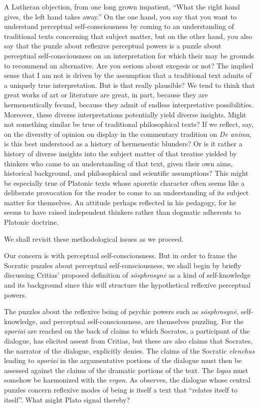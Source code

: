 A Lutheran objection, from one long grown impatient, ``What the right hand gives, the left hand takes away.'' On the one hand, you say that you want to understand perceptual self-consciousness by coming to an understanding of traditional texts concerning that subject matter, but on the other hand, you also say that the puzzle about reflexive perceptual powers is a puzzle about perceptual self-consciousness on an interpretation for which their may be grounds to recommend an alternative. Are you serious about exegesis or not? The implied sense that I am not is driven by the assumption that a traditional text admits of a uniquely true interpretation. But is that really plausible? We tend to think that great works of art or literature are great, in part, because they are hermeneutically fecund, because they admit of endless interpretative possibilities. Moreover, these diverse interpretations potentially yield diverse insights. Might not something similar be true of traditional philosophical texts? If we reflect, say, on the diversity of opinion on display in the commentary tradition on \emph{De anima}, is this best understood as a history of hermeneutic blunders? Or is it rather a history of diverse insights into the subject matter of that treatise yielded by thinkers who came to an understanding of that text, given their own aims, historical background, and philosophical and scientific assumptions? This might be especially true of Platonic texts whose aporetic character often seems like a deliberate provocation for the reader to come to an understanding of its subject matter for themselves. An attitude perhaps reflected in his pedagogy, for he seems to have raised independent thinkers rather than dogmatic adherents to Platonic doctrine.

We shall revisit these methodological issues as we proceed.

Our concern is with perceptual self-consciousness. But in order to frame the Socratic puzzles about perceptual self-consciousness, we shall begin by briefly discussing Critias' proposed definition of \emph{sōsphrosynē} as a kind of self-knowledge and its background since this will structure the hypothetical reflexive perceptual powers. 

The puzzles about the reflexive being of psychic powers such as \emph{sōsphrosynē}, self-knowledge, and perceptual self-consciousness, are themselves puzzling. For the \emph{aporiai} are reached on the back of claims to which Socrates, a participant of the dialogue, has elicited assent from Critias, but these are also claims that Socrates, the narrator of the dialogue, explicitly denies. The claims of the Socratic \emph{elenchus} leading to \emph{aporiai} in the argumentative portions of the dialogue must then be assessed against the claims of the dramatic portions of the text. The \emph{logos} must somehow be harmonized with the \emph{ergon}. As \citet{Schmid:1998aa} observes, the dialogue whose central puzzles concern reflexive modes of being is itself a text that ``relates itself to itself''. What might Plato signal thereby?

